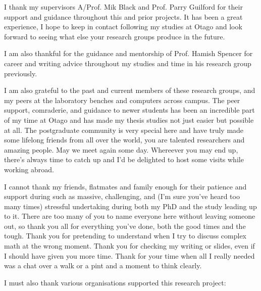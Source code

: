 I thank my supervisors A/Prof. Mik Black and Prof. Parry Guilford for their support and guidance throughout this and prior projects. It has been a great experience, I hope to keep in contact following my studies at Otago and look forward to seeing what else your research groups produce in the future.

I am also thankful for the guidance and mentorship of Prof. Hamish Spencer for career and writing advice throughout my studies and time in his research group previously.

I am also grateful to the past and current members of these research groups, and my peers at the laboratory benches and computers across campus. The peer support, comraderie, and guidance to newer students has been an incredible part of my time at Otago and has made my thesis studies not just easier but possible at all. The postgraduate community is very special here and have truly made some lifelong friends from all over the world, you are talented researchers and amazing people. May we meet again some day. Whereever you may end up, there's always time to catch up and I'd be delighted to host some visits while working abroad.

I cannot thank my friends, flatmates and family enough for their patience and support during such as massive, challenging, and (I'm sure you've heard too many times) stressful undertaking during both my PhD and the study leading up to it. There are too many of you to name everyone here without leaving someone out, so thank you all for everything you've done, both the good times and the tough. Thank you for pretending to understand when I try to discuss complex math at the wrong moment. Thank you for checking my writing or slides, even if I should have given you more time. Thank for your time when all I really needed was a chat over a walk or a pint and a moment to think clearly.

I must also thank various organisations supported this research project:


